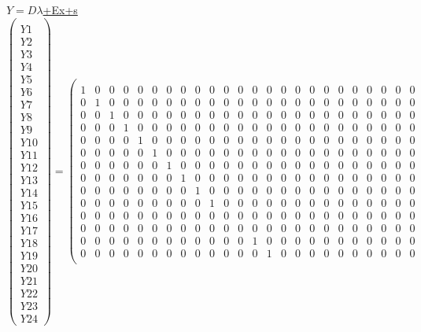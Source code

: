 \small
\underline{$Y=D\lambda$+Ex+s}
\[\left(\begin{array}{c}
  \\Y1\\Y2\\Y3\\Y4\\Y5\\Y6\\Y7\\Y8\\Y9\\Y10\\Y11\\Y12\\Y13\\Y14\\Y15\\Y16\\Y17\\Y18\\Y19\\Y20\\Y21\\Y22\\Y23\\Y24
 \end{array}\right)=
\left(\begin{array}{cccccccccccccccccccccccc}
  \\
  \hline
1&0&0&0&0&0&0&0&0&0&0&0&0&0&0&0&0&0&0&0&0&0&0&0\\
0&1&0&0&0&0&0&0&0&0&0&0&0&0&0&0&0&0&0&0&0&0&0&0\\
0&0&1&0&0&0&0&0&0&0&0&0&0&0&0&0&0&0&0&0&0&0&0&0\\
0&0&0&1&0&0&0&0&0&0&0&0&0&0&0&0&0&0&0&0&0&0&0&0\\
0&0&0&0&1&0&0&0&0&0&0&0&0&0&0&0&0&0&0&0&0&0&0&0\\
0&0&0&0&0&1&0&0&0&0&0&0&0&0&0&0&0&0&0&0&0&0&0&0\\
0&0&0&0&0&0&1&0&0&0&0&0&0&0&0&0&0&0&0&0&0&0&0&0\\
0&0&0&0&0&0&0&1&0&0&0&0&0&0&0&0&0&0&0&0&0&0&0&0\\
0&0&0&0&0&0&0&0&1&0&0&0&0&0&0&0&0&0&0&0&0&0&0&0\\
0&0&0&0&0&0&0&0&0&1&0&0&0&0&0&0&0&0&0&0&0&0&0&0\\
0&0&0&0&0&0&0&0&0&0&0&0&0&0&0&0&0&0&0&0&0&0&0&0\\
0&0&0&0&0&0&0&0&0&0&0&0&0&0&0&0&0&0&0&0&0&0&0&0\\
0&0&0&0&0&0&0&0&0&0&0&0&1&0&0&0&0&0&0&0&0&0&0&0\\
0&0&0&0&0&0&0&0&0&0&0&0&0&1&0&0&0&0&0&0&0&0&0&0\\

\end{array}\]
